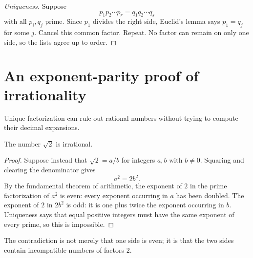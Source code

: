 \begin{proof}[Uniqueness]
Suppose
\[
p_1p_2\cdots p_r=q_1q_2\cdots q_s
\]
with all $p_i,q_j$ prime. Since $p_1$ divides the right side, Euclid's lemma says $p_1=q_j$ for some $j$. Cancel this common factor. Repeat. No factor can remain on only one side, so the lists agree up to order.
\end{proof}

\section{An exponent-parity proof of irrationality}

Unique factorization can rule out rational numbers without trying to compute
their decimal expansions.

\begin{theorem}
The number $\sqrt2$ is irrational.
\end{theorem}

\begin{proof}
Suppose instead that $\sqrt2=a/b$ for integers $a,b$ with $b\ne0$. Squaring
and clearing the denominator gives
\[
  a^2=2b^2.
\]
By the fundamental theorem of arithmetic, the exponent of $2$ in the prime
factorization of $a^2$ is even: every exponent occurring in $a$ has been
doubled. The exponent of $2$ in $2b^2$ is odd: it is one plus twice the
exponent occurring in $b$. Uniqueness says that equal positive integers must
have the same exponent of every prime, so this is impossible.
\end{proof}

\begin{center}

\small The contradiction is not merely that one side is even; it is that the
two sides contain incompatible numbers of factors $2$.
\end{center}

